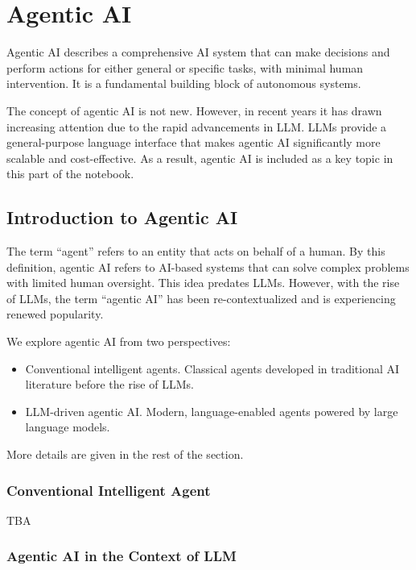 \chapter{Agentic AI} 

Agentic AI describes a comprehensive AI system that can make decisions and perform actions for either general or specific tasks, with minimal human intervention. It is a fundamental building block of autonomous systems.

The concept of agentic AI is not new. However, in recent years it has drawn increasing attention due to the rapid advancements in LLM. LLMs provide a general-purpose language interface that makes agentic AI significantly more scalable and cost-effective. As a result, agentic AI is included as a key topic in this part of the notebook.

\section{Introduction to Agentic AI}

The term ``agent'' refers to an entity that acts on behalf of a human. By this definition, agentic AI refers to AI-based systems that can solve complex problems with limited human oversight. This idea predates LLMs. However, with the rise of LLMs, the term ``agentic AI'' has been re-contextualized and is experiencing renewed popularity.

We explore agentic AI from two perspectives:

\begin{itemize}
  \item Conventional intelligent agents. Classical agents developed in traditional AI literature before the rise of LLMs.
  \item LLM-driven agentic AI. Modern, language-enabled agents powered by large language models.
\end{itemize}

More details are given in the rest of the section.

\subsection{Conventional Intelligent Agent}

TBA

\subsection{Agentic AI in the Context of LLM}

